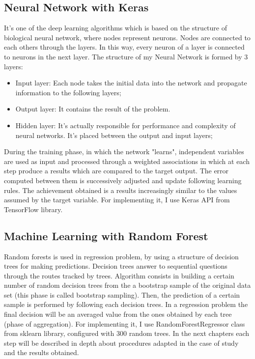 \subsection{Neural Network with Keras}
It's one of the deep learning algorithms which is based on the structure of biological neural network, where nodes represent neurons.
Nodes are connected to each others through the layers. 
In this way, every neuron of a layer is connected to neurons in the next layer.
The structure of my Neural Network is formed by 3 layers:
\begin{itemize}
    \item Input layer: Each node takes the initial data into the network and propagate information to the following layers;
    \item Output layer: It contains the result of the problem. 
    \item Hidden layer: It's actually responsible for performance and complexity of neural networks. It's placed between the output and input layers;
\end{itemize}
During the training phase, in which the network "learns", independent variables are used as input and processed through a weighted associations in which at each step produce a results which are compared to the target output. The error computed between them is successively adjusted and update following learning rules. The achievement obtained is a results increasingly similar to the values assumed by the target variable. 
For implementing it, I use Keras API from TensorFlow library.


\subsection{Machine Learning with Random Forest}
Random forests is used in regression problem, by using a structure of decision trees for making predictions. Decision trees answer to sequential questions through the routes tracked by trees.
Algorithm consists in building a certain number of random decision trees from the a bootstrap sample of the original data set (this phase is called bootstrap sampling). Then, the prediction of a certain sample is performed by following each decision trees. In a regression problem the final decision will be an averaged value from the ones obtained by each tree (phase of aggregation).
For implementing it, I use RandomForestRegressor class from sklearn library, configured with 300 random trees.
\bigbreak
In the next chapters each step will be described in depth about procedures adapted in the case of study and the results obtained.

